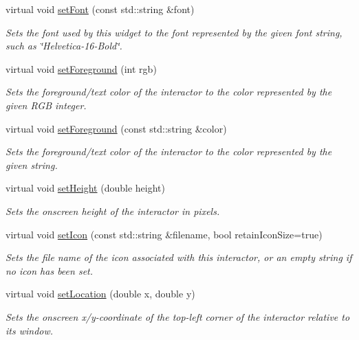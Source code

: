 \begin{DoxyCompactItemize}
virtual void \mbox{\hyperlink{classGInteractor_a8e096e8818d838aceae1d46d58fb3a7b}{set\+Font}} (const std\+::string \&font)
\begin{DoxyCompactList}\small\item\em Sets the font used by this widget to the font represented by the given font string, such as \char`\"{}\+Helvetica-\/16-\/\+Bold\char`\"{}. \end{DoxyCompactList}\item 
virtual void \mbox{\hyperlink{classGInteractor_a9eb856b5ff83a19df3831a31f15f4563}{set\+Foreground}} (int rgb)
\begin{DoxyCompactList}\small\item\em Sets the foreground/text color of the interactor to the color represented by the given R\+GB integer. \end{DoxyCompactList}\item 
virtual void \mbox{\hyperlink{classGInteractor_af59209aeadea6dfc6d97a2d8531f50e1}{set\+Foreground}} (const std\+::string \&color)
\begin{DoxyCompactList}\small\item\em Sets the foreground/text color of the interactor to the color represented by the given string. \end{DoxyCompactList}\item 
virtual void \mbox{\hyperlink{classGInteractor_a9e280bfc4544dfaf8e4376c4e1a74357}{set\+Height}} (double height)
\begin{DoxyCompactList}\small\item\em Sets the onscreen height of the interactor in pixels. \end{DoxyCompactList}\item 
virtual void \mbox{\hyperlink{classGInteractor_a762e139aa311461c3984d3ad28293f64}{set\+Icon}} (const std\+::string \&filename, bool retain\+Icon\+Size=true)
\begin{DoxyCompactList}\small\item\em Sets the file name of the icon associated with this interactor, or an empty string if no icon has been set. \end{DoxyCompactList}\item 
virtual void \mbox{\hyperlink{classGInteractor_a04594e8ba9b98513a64f1da00dcae18c}{set\+Location}} (double x, double y)
\begin{DoxyCompactList}\small\item\em Sets the onscreen x/y-\/coordinate of the top-\/left corner of the interactor relative to its window. \end{DoxyCompactList}\item 

\end{DoxyCompactItemize}
